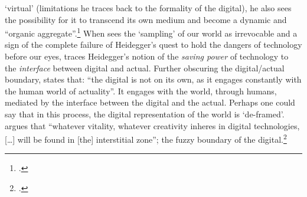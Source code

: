 `virtual' (limitations he traces back to the formality of the digital), he also sees the possibility for it to transcend its own medium and become a dynamic and ``organic aggregate''.\footcite[78]{evens05} When \citeauthor{baudrillard02} sees the `sampling' of our world as irrevocable and a sign of the complete failure of Heidegger's quest to hold the dangers of technology before our eyes, \citeauthor{evens05} traces Heidegger's notion of the \emph{saving power} of technology to the \emph{interface} between digital and actual. Further obscuring the digital/actual boundary, \citeauthor{evens05} states that: ``the digital is not on its own, as it engages constantly with the human world of actuality''. It engages with the world, through humans, mediated by the interface between the digital and the actual. Perhaps one could say that in this process, the digital representation of the world is `de-framed'. \citeauthor{evens05} argues that ``whatever vitality, whatever creativity inheres in digital technologies, [\ldots] will be found in [the] interstitial zone''; the fuzzy boundary of the digital.\footcite[79]{evens05}

